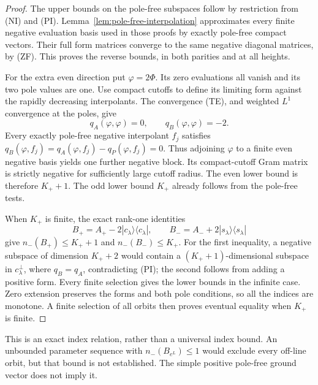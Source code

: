 \documentclass[11pt]{article}
\theoremstyle{remark}\newtheorem{remark}[theorem]{Remark}
\begin{document}
\begin{proof}
The upper bounds on the pole-free subspaces follow by restriction
from (NI) and (PI). Lemma~\ref{lem:pole-free-interpolation}
approximates every finite negative evaluation basis used in those
proofs by exactly pole-free compact vectors. Their full form
matrices converge to the same negative diagonal matrices, by (ZF).
This proves the reverse bounds, in both parities and at all heights.

For the extra even direction put $\varphi=2\Phi$.
Its zero evaluations all vanish and its two pole values are one.
Use compact cutoffs to define its limiting form against the
rapidly decreasing interpolants. The convergence (TE), and
weighted $L^1$ convergence at the poles, give
\[
 q_A(\varphi,\varphi)=0,\qquad q_B(\varphi,\varphi)=-2.
\]
Every exactly pole-free negative interpolant $f_j$ satisfies
$q_B(\varphi,f_j)=q_A(\varphi,f_j)-q_P(\varphi,f_j)=0$.
Thus adjoining $\varphi$ to a finite even negative basis yields
one further negative block. Its compact-cutoff Gram matrix is
strictly negative for sufficiently large cutoff radius.
The even lower bound is therefore $K_++1$.
The odd lower bound $K_+$ already follows from the pole-free tests.

When $K_+$ is finite, the exact rank-one identities
\[
 B_+=A_+-2|c_\lambda\rangle\langle c_\lambda|,\qquad
 B_-=A_-+2|s_\lambda\rangle\langle s_\lambda|
\]
give $n_-(B_+)\le K_++1$ and $n_-(B_-)\le K_+$.
For the first inequality, a negative subspace of dimension
$K_++2$ would contain a $(K_++1)$-dimensional subspace in
$c_\lambda^\perp$, where $q_B=q_A$, contradicting (PI);
the second follows from adding a positive form.
Every finite selection gives the lower bounds in the infinite case.
Zero extension preserves the forms and both pole conditions,
so all the indices are monotone. A finite selection of all orbits
then proves eventual equality when $K_+$ is finite.
\end{proof}

This is an exact index relation, rather than a universal index bound.
An unbounded parameter sequence with $n_-(B_{e^L})\le1$ would
exclude every off-line orbit, but that bound is not established.
The simple positive pole-free ground vector does not imply it.
\end{document}
